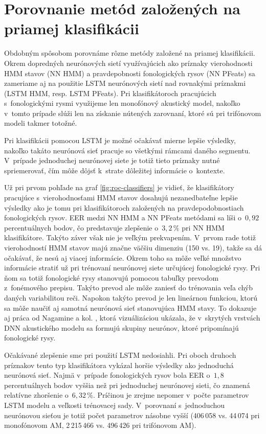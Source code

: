 \section{Porovnanie metód založených na priamej klasifikácii}

Obdobným spôsobom porovnáme rôzne metódy založené na priamej klasifikácii. Okrem dopredných neurónových sietí využívajúcich ako príznaky vierohodnosti HMM stavov (NN HMM) a pravdepobnosti fonologických rysov (NN PFeats) sa zameriame aj na použitie LSTM neurónových sietí nad rovnakými príznakmi (LSTM HMM, resp. LSTM PFeats). Pri klasifikátoroch pracujúcich s~fonologickými rysmi využijeme len monofónový akustický model, nakoľko v~tomto prípade slúži len na získanie nútených zarovnaní, ktoré sú pri trifónovom modeli takmer totožné.

Pri klasifikácii pomocou LSTM je možné očakávať mierne lepšie výsledky, nakoľko takáto neurónová sieť pracuje so všetkými rámcami daného segmentu. V~prípade jednoduchej neurónovej siete je totiž tieto príznaky nutné spriemerovať, čím môže dôjsť k~strate dôležitej informácie o~kontexte.

Už pri prvom pohľade na graf \ref{fig:roc-classifiers} je vidieť, že klasifikátory pracujúce s~vierohodnosťami HMM stavov dosahujú nezanedbateľne lepšie výsledky ako je tomu pri klasifikátoroch založených na pravdepodobnostiach fonologických rysov. EER medzi NN HMM a NN PFeats metódami sa líši o~$0{,}92$ percentuálnych bodov, čo predstavuje zlepšenie o~$3{,}2\,\%$ pri NN HMM klasifikátore. Takýto záver však nie je veľkým prekvapením. V~prvom rade totiž vierohodností HMM stavov majú značne väčšiu dimenziu (150 vs. 19), takže sa dá očakávať, že nesú aj viacej informácie. Okrem toho sa môže veľké množstvo informácie stratiť už pri trénovaní neurónovej siete určujúcej fonologické rysy. Pri ňom sa totiž fonologické rysy stanovujú pomocou tabuľky prevodom z~fonémového prepisu. Takýto prevod ale môže zaniesť do trénovania veľa chýb daných variabilitou reči. Napokon takýto prevod je len lineárnou funkciou, ktorú sa môže naučiť aj samotná neurónová sieť stanovujúca HMM stavy. To dokazuje aj práca od Nagamine a kol. \cite{Nagamine2015}, ktorá vizuálizáciou ukázala, že v~skrytých vrstvách DNN akustického modelu sa formujú skupiny neurónov, ktoré pripomínajú fonologické rysy.

Očakávané zlepšenie sme pri použití LSTM nedosiahli. Pri oboch druhoch príznakov tento typ klasifikátora vykázal horšie výsledky ako jednoduchá neurónová sieť. Najmä v~prípade fonologických rysov bola EER o~$1{,}8$ percentuálnych bodov vyššia než pri jednoduchej neurónovej sieti, čo znamená relatívne zhoršenie o~$6{,}32\,\%$. Príčinou je zrejme nepomer v~počte parametrov LSTM modelu a veľkosti trénovacej sady. V~porovnaní s~jednoduchou neurónovou sieťou je totiž počet parametrov násobne vyšší (406\,058 vs. 44\,074 pri monofónovom AM, 2\,215\,466 vs. 496\,426 pri trifónovom AM). 

